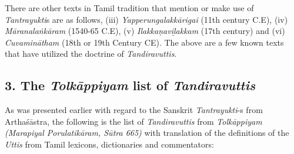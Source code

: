 There are other texts in Tamil tradition that mention or make use of \textit{Tantrayukti}s are as follows, (iii) \textit{Yapperungalakkārigai} (11th century C.E), (iv) \textit{Māranalaṅkāram} (1540-65 C.E), (v) \textit{Ilakkaṇaviḻakkam} (17th century) and (vi) \textit{Cuvaminātham} (18th or 19th Century CE). The above are a few known texts that have utilized the doctrine of \textit{Tandiravuttis}.


\subsection*{3. The \textit{Tolkāppiyam} list of \textit{Tandiravuttis}}

As was presented earlier with regard to the Sanskrit \textit{Tantrayukti}-s from Arthaśāstra, the following is the list of \textit{Tandiravuttis} from \textit{Tolkāppiyam (Marapiyal Porulatikāram, Sūtra 665)} with translation of the definitions of the \textit{Uttis} from Tamil lexicons, dictionaries and commentators:

